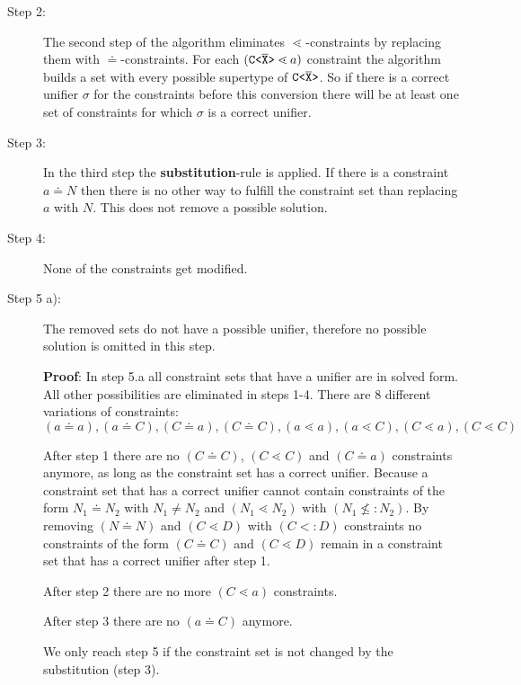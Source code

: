\begin{description}
\item[Step 2:]
The second step of the algorithm eliminates $\lessdot$-constraints
by replacing them with $\doteq$-constraints.
For each $(\mathtt{C \texttt{<} \overline{\tt X} \texttt{>} } \lessdot a)$ constraint the algorithm builds a set with every
possible supertype of $\mathtt{C \texttt{<} \overline{\tt X} \texttt{>} }$.
So if there is a correct unifier $\sigma$ for the constraints before this conversion there will be at least one set of
constraints for which $\sigma$ is a correct unifier.

\item[Step 3:]
In the third step the \textbf{substitution}-rule is applied.
If there is a constraint $a \doteq N$ then there is no other way to fulfill the constraint set
than replacing $a$ with $N$.
This does not remove a possible solution.

\item[Step 4:]
None of the constraints get modified.

\item[Step 5 a):]
The removed sets do not have a possible unifier, therefore no possible solution is
omitted in this step.

\textbf{Proof}:
In step 5.a all constraint sets that have a unifier are in solved form.
All other possibilities are eliminated in steps 1-4.
There are 8 different variations of constraints:\\
$(a \doteq a), (a \doteq C), (C \doteq a), (C \doteq C), (a \lessdot a), (a \lessdot C), (C \lessdot a), (C \lessdot C)$

After step 1 there are no $(C \doteq C)$, $(C \lessdot C)$ and $(C \doteq a)$ constraints anymore,
as long as the constraint set has a correct unifier.
Because a constraint set that has a correct unifier cannot contain constraints of the form $N_1 \doteq N_2$ with $N_1 \neq N_2$ and
$(N_1 \lessdot N_2)$ with $(N_1 \nleq: N_2)$.
By removing $(N \doteq N)$ and $(C \lessdot D)$ with $(C <: D)$ constraints
no constraints of the form $(C \doteq C)$ and $(C \lessdot D)$
remain in a constraint set that has a correct unifier after step 1.

After step 2 there are no more $(C \lessdot a)$ constraints.

After step 3 there are no $(a \doteq C)$ anymore.

We only reach step 5 if the constraint set is not changed by the substitution (step 3).



\end{description}
